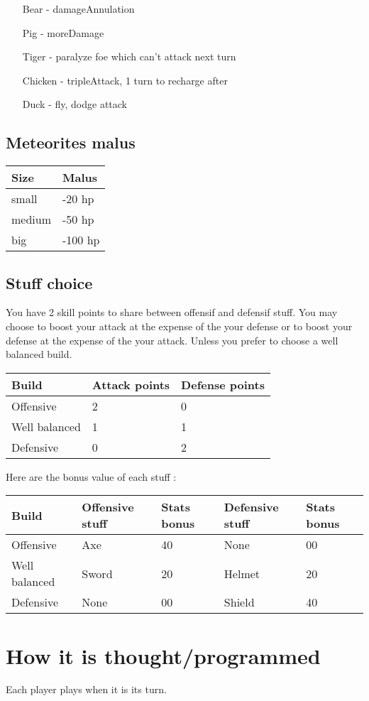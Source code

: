 \begin{itemize}
 \item[Bear] - damageAnnulation
 \item[Pig] - moreDamage
 \item[Tiger] - paralyze foe which can't attack next turn
 \item[Chicken] - tripleAttack, 1 turn to recharge after
 \item[Duck] - fly, dodge attack
\end{itemize}


\subsection{Meteorites malus}

\begin{tabular}{|R{3cm}|C{3cm}|}
\hline {} Size & Malus \\
\hline small & -20 hp\\
\hline medium & -50 hp \\
\hline big & -100 hp \\
\hline 
\end{tabular}


\subsection{Stuff choice}
You have 2 skill points to share between offensif and defensif stuff. 
You may choose to boost your attack at the expense of the your defense or to boost your defense at the expense of the your attack. 
Unless you prefer to choose a well balanced build.

\begin{tabular}{|R{3,5cm}|C{3cm}|C{3cm}|}
\hline {} Build & Attack points & Defense points  \\
\hline Offensive & 2 & 0 \\
\hline Well balanced & 1 & 1 \\
\hline Defensive & 0 & 2 \\
\hline 
\end{tabular}

Here are the bonus value of each stuff :

\begin{tabular}{|R{3,5cm}|C{3cm}|C{2cm}|C{3cm}|C{2cm}|}
\hline {} Build & Offensive stuff & Stats bonus & Defensive stuff & Stats bonus \\
\hline Offensive & Axe & 40 & None & 00 \\
\hline Well balanced & Sword & 20 & Helmet & 20 \\
\hline Defensive & None & 00 & Shield & 40 \\
\hline 
\end{tabular}

\section{How it is thought/programmed}

Each player plays when it is its turn.



